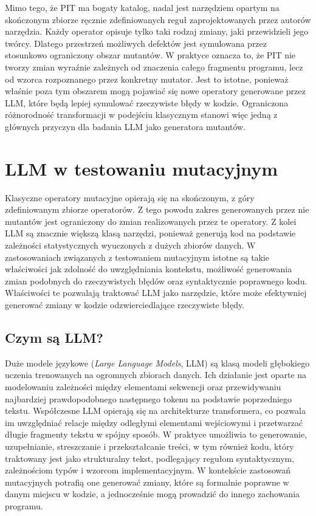 \documentclass[12pt,a4paper,oldfontcommands]{memoir}
\theoremstyle{plain}
\theoremstyle{definition}
\theoremstyle{remark}
\begin{document}
    Mimo tego, że PIT ma bogaty katalog, nadal jest narzędziem opartym na skończonym zbiorze ręcznie zdefiniowanych reguł zaprojektowanych przez autorów narzędzia.
    Każdy operator opisuje tylko taki rodzaj zmiany, jaki przewidzieli jego twórcy.
    Dlatego przestrzeń możliwych defektów jest symulowana przez stosunkowo ograniczony obszar mutantów.
    W praktyce oznacza to, że PIT nie tworzy zmian wyraźnie zależnych od znaczenia całego fragmentu programu, lecz od wzorca rozpoznanego przez konkretny mutator.
    Jest to istotne, ponieważ właśnie poza tym obszarem mogą pojawiać się nowe operatory generowane przez LLM, które będą lepiej symulować rzeczywiste błędy w kodzie.
    Ograniczona różnorodność transformacji w podejściu klasycznym stanowi więc jedną z głównych przyczyn dla badania LLM jako generatora mutantów.

    \clearpage
    \openany
    \chapter{LLM w testowaniu mutacyjnym}
    \openright

    Klasyczne operatory mutacyjne opierają się na skończonym, z góry zdefiniowanym zbiorze operatorów.
    Z tego powodu zakres generowanych przez nie mutantów jest ograniczony do zmian realizowanych przez te operatory.
    Z kolei LLM są znacznie większą klasą narzędzi, ponieważ generują kod na podstawie zależności statystycznych wyuczonych z dużych zbiorów danych.
    W zastosowaniach związanych z testowaniem mutacyjnym \cite{ref6} istotne są takie właściwości jak zdolność do uwzględniania kontekstu, możliwość generowania zmian podobnych do rzeczywistych błędów oraz syntaktycznie poprawnego kodu.
    Właściwości te pozwalają traktować LLM jako narzędzie, które może efektywniej generować zmiany w kodzie odzwierciedlające rzeczywiste błędy.

    \section{Czym są LLM?}

    Duże modele językowe (\textit{Large Language Models}, LLM) są klasą modeli głębokiego uczenia trenowanych na ogromnych zbiorach danych.
    Ich działanie jest oparte na modelowaniu zależności między elementami sekwencji oraz przewidywaniu najbardziej prawdopodobnego następnego tokenu na podstawie poprzedniego tekstu.
    Współczesne LLM opierają się na architekturze transformera, co pozwala im uwzględniać relacje między odległymi elementami wejściowymi i przetwarzać długie fragmenty tekstu w spójny sposób.
    W praktyce umożliwia to generowanie, uzupełnianie, streszczanie i przekształcanie treści, w tym również kodu, który traktowany jest jako strukturalny tekst, podlegający regułom syntaktycznym, zależnościom typów i wzorcom implementacyjnym.
    W kontekście zastosowań mutacyjnych potrafią one generować zmiany, które są formalnie poprawne w danym miejscu w kodzie, a jednocześnie mogą prowadzić do innego zachowania programu.
\end{document}
